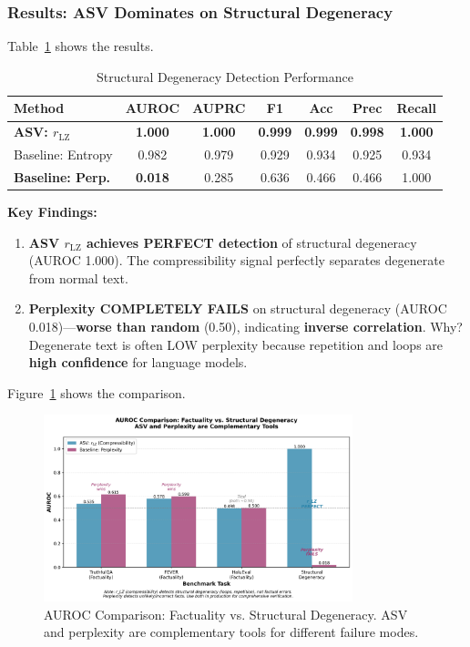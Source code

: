 \documentclass[11pt]{article}
\begin{document}
\subsubsection{Results: ASV Dominates on Structural Degeneracy}

Table~\ref{tab:degeneracy-results} shows the results.

\begin{table}[h]
\centering
\caption{Structural Degeneracy Detection Performance}
\label{tab:degeneracy-results}
\begin{tabular}{lcccccc}
\toprule
\textbf{Method} & \textbf{AUROC} & \textbf{AUPRC} & \textbf{F1} & \textbf{Acc} & \textbf{Prec} & \textbf{Recall} \\
\midrule
\textbf{ASV: $r_{\text{LZ}}$} & \textbf{1.000} & \textbf{1.000} & \textbf{0.999} & \textbf{0.999} & \textbf{0.998} & \textbf{1.000} \\
Baseline: Entropy & 0.982 & 0.979 & 0.929 & 0.934 & 0.925 & 0.934 \\
\textbf{Baseline: Perp.} & \textbf{0.018} & 0.285 & 0.636 & 0.466 & 0.466 & 1.000 \\
\bottomrule
\end{tabular}
\end{table}

\textbf{Key Findings:}
\begin{enumerate}
\item \textbf{ASV $r_{\text{LZ}}$ achieves PERFECT detection} of structural degeneracy (AUROC 1.000). The compressibility signal perfectly separates degenerate from normal text.
\item \textbf{Perplexity COMPLETELY FAILS} on structural degeneracy (AUROC 0.018)---\textbf{worse than random} (0.50), indicating \textbf{inverse correlation}. Why? Degenerate text is often LOW perplexity because repetition and loops are \textbf{high confidence} for language models.
\end{enumerate}

Figure~\ref{fig:degeneracy-comparison} shows the comparison.

\begin{figure}[h]
\centering
\includegraphics[width=0.8\textwidth]{figures/comparison_bars.png}
\caption{AUROC Comparison: Factuality vs. Structural Degeneracy. ASV and perplexity are complementary tools for different failure modes.}
\label{fig:degeneracy-comparison}
\end{figure}
\end{document}
